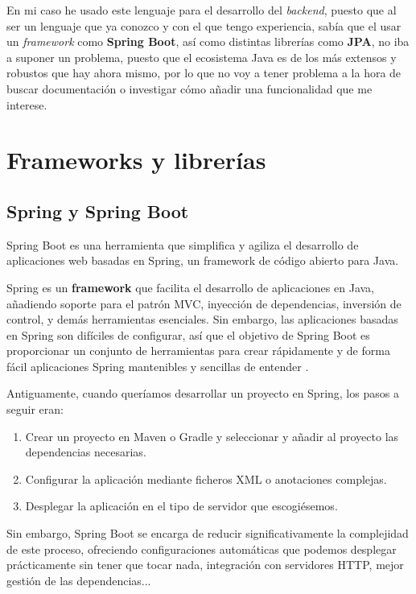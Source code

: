  En mi caso he usado este lenguaje para el desarrollo del \textit{backend}, puesto que al ser un lenguaje que ya conozco y con el que tengo experiencia, sabía 	que el usar un \textit{framework} como \textbf{Spring Boot}, así como distintas librerías como \textbf{JPA}, no iba a suponer un problema, puesto que el ecosistema Java es de los más extensos y robustos que hay ahora mismo, por lo que no voy a tener problema a la hora de buscar documentación o investigar cómo añadir una funcionalidad que me interese.

\section{Frameworks y librerías}

\subsection{Spring y Spring Boot}

Spring Boot es una herramienta que simplifica y agiliza el desarrollo de aplicaciones web basadas en Spring, un framework de código abierto para Java.

Spring es un \textbf{framework} que facilita el desarrollo de aplicaciones en Java, añadiendo soporte para el patrón MVC, inyección de dependencias, inversión de control, y demás herramientas esenciales. Sin embargo, las aplicaciones basadas en Spring son difíciles de configurar, así que el objetivo de Spring Boot es proporcionar un conjunto de herramientas para crear rápidamente y de forma fácil aplicaciones Spring mantenibles y sencillas de entender \cite{spring:spring-boot}.

Antiguamente, cuando queríamos desarrollar un proyecto en Spring, los pasos a seguir eran: 

\begin{enumerate}
  \item Crear un proyecto en Maven o Gradle y seleccionar y añadir al proyecto las dependencias necesarias.
  \item Configurar la aplicación mediante ficheros XML o anotaciones complejas.
  \item Desplegar la aplicación en el tipo de servidor que escogiésemos.
\end{enumerate}

Sin embargo, Spring Boot se encarga de reducir significativamente la complejidad de este proceso, ofreciendo configuraciones automáticas que podemos desplegar prácticamente sin tener que tocar nada, integración con servidores HTTP, mejor gestión de las dependencias... \cite{arquitectura-java:spring-boot}

